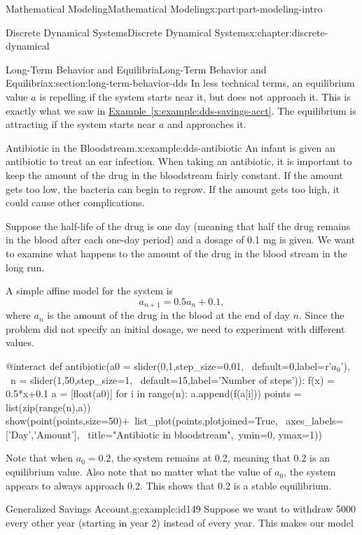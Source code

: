 \documentclass[oneside,10pt,]{book}
\newcommand{\xreffont}{\relax}
\numberwithin{equation}{section}
\begin{document}
\begin{partptx}{Mathematical Modeling}{}{Mathematical Modeling}{}{}{x:part:part-modeling-intro}
\begin{chapterptx}{Discrete Dynamical Systems}{}{Discrete Dynamical Systems}{}{}{x:chapter:discrete-dynamical}
\begin{sectionptx}{Long-Term Behavior and Equilibria}{}{Long-Term Behavior and Equilibria}{}{}{x:section:long-term-behavior-dds}
In less technical terms, an equilibrium value \(a\) is repelling if the system starts near it, but does not approach it. This is exactly what we saw in \hyperref[x:example:dds-savings-acct]{Example~{\xreffont\ref{x:example:dds-savings-acct}}}. The equilibrium is attracting if the system starts near \(a\) and approaches it.%
\begin{example}{Antibiotic in the Bloodstream.}{x:example:dds-antibiotic}%
An infant is given an antibiotic to treat an ear infection. When taking an antibiotic, it is important to keep the amount of the drug in the bloodstream fairly constant.  If the amount gets too low, the bacteria can begin to regrow.  If the amount gets too high, it could cause other complications.%
\par
Suppose the half-life of the drug is one day (meaning that half the drug remains in the blood after each one-day period) and a dosage of 0.1 mg is given.  We want to examine what happens to the amount of the drug in the blood stream in the long run.%
\par
A simple affine model for the system is%
%
\begin{equation*}
a_{n+1} = 0.5a_n + 0.1,
\end{equation*}
where \(a_n\) is the amount of the drug in the blood at the end of day \(n\). Since the problem did not specify an initial dosage, we need to experiment with different values.%
\begin{sageinput}
@interact
def antibiotic(a0 = slider(0,1,step_size=0.01, \
				default=0,label=r'\(a_0\)'), \
				n = slider(1,50,step_size=1, \
				default=15,label='Number of steps')):
    f(x) = 0.5*x+0.1
    a = [float(a0)]
    for i in range(n):
        a.append(f(a[i]))
    points = list(zip(range(n),a))
    show(point(points,size=50)+\
         list_plot(points,plotjoined=True, \
         			axes_labels=['Day','Amount'], \
                   title="Antibiotic in bloodstream",\
                  ymin=0, ymax=1))
\end{sageinput}
Note that when \(a_0 = 0.2\), the system remains at 0.2, meaning that 0.2 is an equilibrium value. Also note that no matter what the value of \(a_0\), the system appears to always approach 0.2. This shows that 0.2 is a stable equilibrium.%
\end{example}
\begin{example}{Generalized Savings Account.}{g:example:id149}%
Suppose we want to withdraw \textdollar{}5000 every other year (starting in year 2) instead of every year. This makes our model%
%
\begin{equation*}

\end{equation*}
\end{example}
\end{sectionptx}
\end{chapterptx}
\end{partptx}
\end{document}
